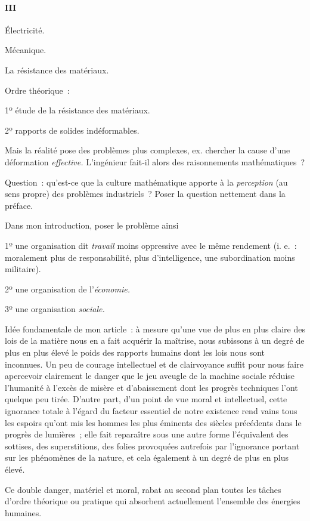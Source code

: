 \documentclass[french,twoside]{book} %
\begin{document}
\paragraph[III]{III}
\noindent Électricité.\par
Mécanique.\par
La résistance des matériaux.\par
Ordre théorique :\par
1º étude de la résistance des matériaux.\par
2º rapports de solides indéformables.\par
Mais la réalité pose des problèmes plus complexes, ex. chercher la cause d'une déformation {\itshape effective.} L'ingénieur fait-il alors des raisonnements mathématiques ?\par
Question : qu'est-ce que la culture mathématique apporte à la {\itshape perception} (au sens propre) des problèmes industriels ? Poser la question nettement dans la préface.\par
Dans mon introduction, poser le problème ainsi\par
1º une organisation dit {\itshape travail} moins oppressive avec le même rendement (i. e. : moralement plus de responsabilité, plus d'intelligence, une subordination moins militaire).\par
2º une organisation de l’{\itshape économie.}\par
3º une organisation {\itshape sociale.}\par
Idée fondamentale de mon article : à mesure qu'une vue de plus en plus claire des lois de la matière nous en a fait acquérir la maîtrise, nous subissons à un degré de plus en plus élevé le poids des rapports humains dont les lois nous sont inconnues. Un peu de courage intellectuel et de clairvoyance suffit pour nous faire apercevoir clairement le danger que le jeu aveugle de la machine sociale réduise l'humanité à l'excès de misère et d'abaissement dont les progrès techniques l'ont quelque peu tirée. D'autre part, d'un point de vue moral et intellectuel, cette ignorance totale à l'égard du facteur essentiel de notre existence rend vains tous les espoirs qu'ont mis les hommes les plus éminents des siècles précédents dans le progrès de lumières ; elle fait reparaître sous une autre forme l'équivalent des sottises, des superstitions, des folies provoquées autrefois par l'ignorance portant sur les phénomènes de la nature, et cela également à un degré de plus en plus élevé.\par
Ce double danger, matériel et moral, rabat au second plan toutes les tâches d'ordre théorique ou pratique qui absorbent actuellement l'ensemble des énergies humaines.\par
\end{document}
